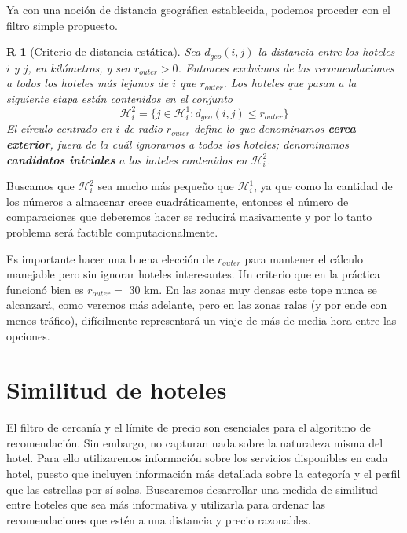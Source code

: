 \documentclass[12pt]{report}
\newcommand{\HH}{\mathcal{H}}
\newtheorem{regla}{R}%
\begin{document}
Ya con una noción de distancia geográfica establecida, podemos proceder con el filtro simple propuesto.

\begin{regla}[Criterio de distancia estática] \label{r:distanciaestatica}
Sea $d_{geo}(i,j)$ la distancia entre los hoteles $i$ y $j$, en kilómetros, y sea $r_{outer} > 0$. Entonces excluimos de las recomendaciones a todos los hoteles más lejanos de $i$ que $r_{outer}$. Los hoteles que pasan a la siguiente etapa están contenidos en el conjunto
\[
\HH_i^2 = \{j \in \HH_i^1 : d_{geo}(i,j) \leq r_{outer}\}
\]
El círculo centrado en $i$ de radio $r_{outer}$ define lo que denominamos \textbf{cerca exterior}, fuera de la cuál ignoramos a todos los hoteles; denominamos \textbf{candidatos iniciales} a los hoteles contenidos en $\HH_i^2$.
\end{regla}
Buscamos que $\HH_i^2$ sea mucho más pequeño que $\HH_i^1$, ya que como la cantidad de los números a almacenar crece cuadráticamente, entonces el número de comparaciones que deberemos hacer se reducirá masivamente y por lo tanto problema será factible computacionalmente.

Es importante hacer una buena elección de $r_{outer}$ para mantener el cálculo manejable pero sin ignorar hoteles interesantes. Un criterio que en la práctica funcionó bien es $r_{outer} =$ 30 km. En las zonas muy densas este tope nunca se alcanzará, como veremos más adelante, pero en las zonas ralas (y por ende con menos tráfico), difícilmente representará un viaje de más de media hora entre las opciones.

\section{Similitud de hoteles}

El filtro de cercanía y el límite de precio son esenciales para el algoritmo de recomendación. Sin embargo, no capturan nada sobre la naturaleza misma del hotel. Para ello utilizaremos información sobre los servicios disponibles en cada hotel, puesto que incluyen información más detallada sobre la categoría y el perfil que las estrellas por sí solas. Buscaremos desarrollar una medida de similitud entre hoteles que sea más informativa y utilizarla para ordenar las recomendaciones que estén a una distancia y precio razonables.
\end{document}
